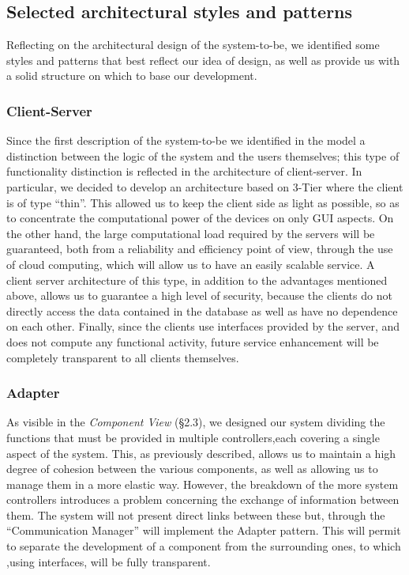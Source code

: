\documentclass[10pt, a4paper,titlepage]{article}
\begin{document}
\subsection{Selected architectural styles and patterns}
Reflecting on the architectural design of the system-to-be, we identified some styles and patterns that best reflect our idea of design, as well as provide us with a solid structure on which to base our development.
\subsubsection*{Client-Server}
Since the first description of the system-to-be we identified in the model a distinction between the logic of the system and the users themselves; this type of functionality distinction is reflected in the architecture of client-server.
In particular, we decided to develop an architecture based on 3-Tier where the client is of type “thin”.
This allowed us to keep the client side as light as possible, so as to concentrate the computational power of the devices on only GUI aspects. 
On the other hand, the large computational load required by the servers will be guaranteed, both from a reliability and efficiency point of view, through the use of cloud computing, which will allow us to have an easily scalable service.
A client server architecture of this type, in addition to the advantages mentioned above, allows us to guarantee a high level of security, because the clients do not directly access the data contained in the database as well as have no dependence on each other.
Finally, since the clients use interfaces provided by the server, and does not compute any functional activity, future service enhancement will be completely transparent to all clients themselves.
\subsubsection*{Adapter}
As visible in the \emph{Component View} (\S 2.3), we designed our system dividing the functions that must be provided in multiple controllers,each covering a single aspect of the system.
This, as previously described, allows us to maintain a high degree of cohesion between the various components, as well as allowing us to manage them in a more elastic way.
However, the breakdown of the more system controllers introduces a problem concerning the exchange of information between them. The system will not present direct links between these but, through the “Communication Manager” will implement the Adapter pattern. This will permit to separate the development of a component from the surrounding ones, to which ,using interfaces, will be fully transparent.
\end{document}
